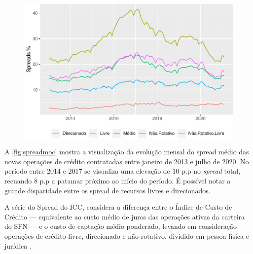 \documentclass[12pt,12pt,openright,oneside,a4paper,chapter=TITLE,section=TITLE,subsection=TITLE,subsubsection=TITLE,english,french,spanish,portugues,sumario=tradicional]{abntex2}
\begin{document}
\begin{figure}

\begin{center}\includegraphics{12-exportedfigures/spread 2019 moc-1} \end{center}
\label{fig:spreadmoc}
\end{figure}

A \autoref{fig:spreadmoc} mostra a visualização da evolução mensal do spread
médio das novas operações de crédito contratadas entre janeiro de 2013 e julho
de 2020. No período entre 2014 e 2017 se visualiza uma elevação de 10 p.p no
\emph{spread} total, recuando 8 p.p a patamar próximo ao início do período. É possível notar a grande disparidade entre os spread de recursos livres e direcionados.

A série do Spread do ICC, considera a diferença entre o Índice de Custo de
Crédito --- equivalente ao custo médio de juros das operações ativas da carteira
do SFN --- e o custo de captação médio ponderado, levando em consideração
operações de crédito livre, direcionado e não rotativo, dividido em pessoa
física e jurídica \cite{BCB:2016}.
\end{document}
